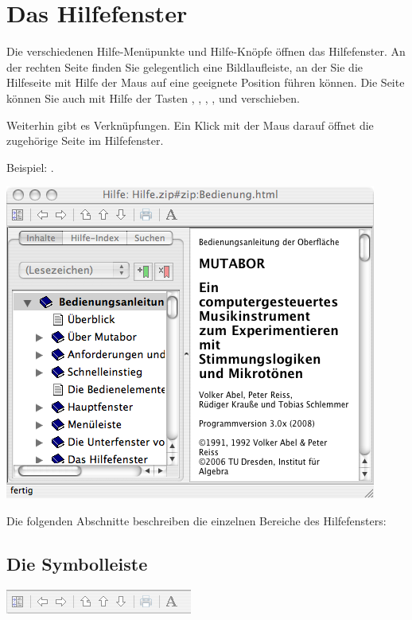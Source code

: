 \chapter{Das Hilfefenster}\label{sec:HELPWINDOW}

Die verschiedenen Hilfe-Menüpunkte und Hilfe-Knöpfe öffnen das
Hilfefenster. An der rechten Seite finden Sie gelegentlich eine
Bildlaufleiste, an der Sie die Hilfeseite mit Hilfe der Maus auf eine
geeignete Position führen können. Die Seite können Sie auch mit Hilfe
der Tasten \LArrow, \UArrow, \DArrow, \RArrow, \PgUp{} und \PgDown{}
verschieben.

Weiterhin gibt es Verknüpfungen. Ein Klick mit der Maus darauf öffnet die 
zugehörige Seite im Hilfefenster. 

Beispiel: .

\ifhtml
{}
\else
\includegraphics{Hilfefenster}
\fi

Die folgenden Abschnitte beschreiben die einzelnen Bereiche des Hilfefensters:

\section{Die Symbolleiste}
\label{sec:die-symbolleiste}

\ifhtml
{}%
\else
\includegraphics{helptoolbar}
\fi


